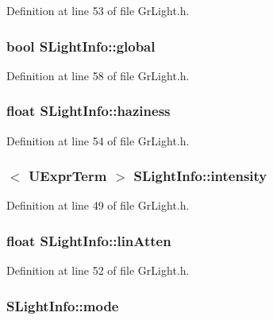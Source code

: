 Definition at line 53 of file GrLight.h.\hypertarget{struct_s_light_info_6fd689b605dab56da126d26a09bba6c9}{
\subsubsection[{global}]{\setlength{\rightskip}{0pt plus 5cm}bool {\bf SLightInfo::global}}}
\label{struct_s_light_info_6fd689b605dab56da126d26a09bba6c9}




Definition at line 58 of file GrLight.h.\hypertarget{struct_s_light_info_df2fa81977b29ac3e37450ffaedf965c}{
\subsubsection[{haziness}]{\setlength{\rightskip}{0pt plus 5cm}float {\bf SLightInfo::haziness}}}
\label{struct_s_light_info_df2fa81977b29ac3e37450ffaedf965c}




Definition at line 54 of file GrLight.h.\hypertarget{struct_s_light_info_086fba67bb218313e6fb4d847fca2c7b}{
\subsubsection[{intensity}]{$<$ {\bf UExprTerm} $>$ {\bf SLightInfo::intensity}}}
\label{struct_s_light_info_086fba67bb218313e6fb4d847fca2c7b}




Definition at line 49 of file GrLight.h.\hypertarget{struct_s_light_info_1bd8a695b7e702cb94afb98baa608491}{
\subsubsection[{linAtten}]{\setlength{\rightskip}{0pt plus 5cm}float {\bf SLightInfo::linAtten}}}
\label{struct_s_light_info_1bd8a695b7e702cb94afb98baa608491}




Definition at line 52 of file GrLight.h.\hypertarget{struct_s_light_info_78ee5f1900b538a2ab102f3db65a9b46}{
\subsubsection[{mode}]{ {\bf SLightInfo::mode}}}
\label{struct_s_light_info_78ee5f1900b538a2ab102f3db65a9b46}




